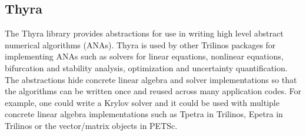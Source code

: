 
\subsection{Thyra}
The Thyra library provides abstractions for use in writing high level abstract numerical algorithms (ANAs). Thyra is used by other Trilinos packages for implementing ANAs such as solvers for linear equations, nonlinear equations, bifurcation and stability analysis, optimization and uncertainty quantification. The abstractions hide concrete linear algebra and solver implementations so that the algorithms can be written once and reused across many application codes. For example, one could write a Krylov solver and it could be used with multiple concrete linear algebra implementations such as Tpetra in Trilinos, Epetra in Trilinos or the vector/matrix objects in PETSc.

